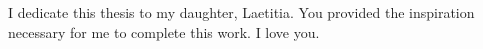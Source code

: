 
\begin{dedication} 

I dedicate this thesis to my daughter, Laetitia. You provided the inspiration necessary for me to complete this work. I love you.

\end{dedication}